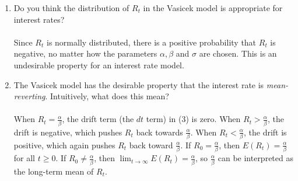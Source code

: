 \documentclass[11pt,a4,table]{article}
\begin{document}
\begin{enumerate}
\begin{enumerate}
        \item Do you think the distribution of $R_t$ in the Vasicek model is appropriate for interest rates?\\\\
        Since $R_t$ is normally distributed, there is a positive probability that $R_t$ is negative, no matter how the parameters $\alpha, \beta$ and $\sigma$ are chosen. This is an undesirable property for an interest rate model.
        
        \item The Vasicek model has the desirable property that the interest rate is \textit{mean-reverting}. Intuitively, what does this mean?\\\\
        When $R_t = \frac{\alpha}{\beta}$, the drift term (the $dt$ term) in (3) is zero. When $R_t > \frac{\alpha}{\beta}$, the drift is negative, which pushes $R_t$ back towards $\frac{\alpha}{\beta}$. When $R_t < \frac{\alpha}{\beta}$, the drift is positive, which again pushes $R_t$ back toward $\frac{\alpha}{\beta}$. If $R_0 = \frac{\alpha}{\beta}$, then $E(R_t) = \frac{\alpha}{\beta}$ for all $t\geq 0$. If $R_0 \neq \frac{\alpha}{\beta}$, then $\lim_{t\rightarrow \infty} E(R_t) = \frac{\alpha}{\beta}$, so $\frac{\alpha}{\beta}$ can be interpreted as the long-term mean of $R_t$.
    \end{enumerate}
    

\end{enumerate}
\end{document}
